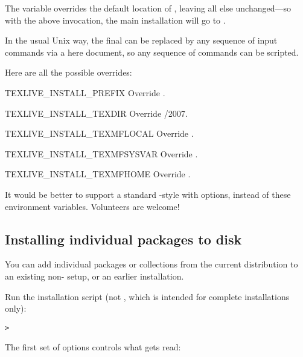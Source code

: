 \documentclass{article}
\begin{document}
The  variable overrides the default
location of , leaving all else
unchanged---so with the above invocation, the main installation will go
to .

In the usual Unix way, the final  can be replaced by any
sequence of input commands via a here document, so any sequence of
commands can be scripted.

Here are all the possible overrides:

\begin{ttdescription}
\item [TEXLIVE\_INSTALL\_PREFIX]
      Override .
\item [TEXLIVE\_INSTALL\_TEXDIR]
      Override /2007.
\item [TEXLIVE\_INSTALL\_TEXMFLOCAL]
      Override .
\item [TEXLIVE\_INSTALL\_TEXMFSYSVAR]
      Override .
\item [TEXLIVE\_INSTALL\_TEXMFHOME]
      Override .
\end{ttdescription}

It would be better to support a standard -style
 with options, instead of these environment
variables.  Volunteers are welcome!


% 
\subsection{Installing individual packages to disk}

You can add individual packages or collections from the current
distribution to an existing non-\TL{} setup, or an earlier
\TL{} installation.  

\startinst

Run the installation script  (not
, which is intended for complete installations
only):
\begin{alltt}
> 
\end{alltt}

The first set of options controls what gets read:
\end{document}
